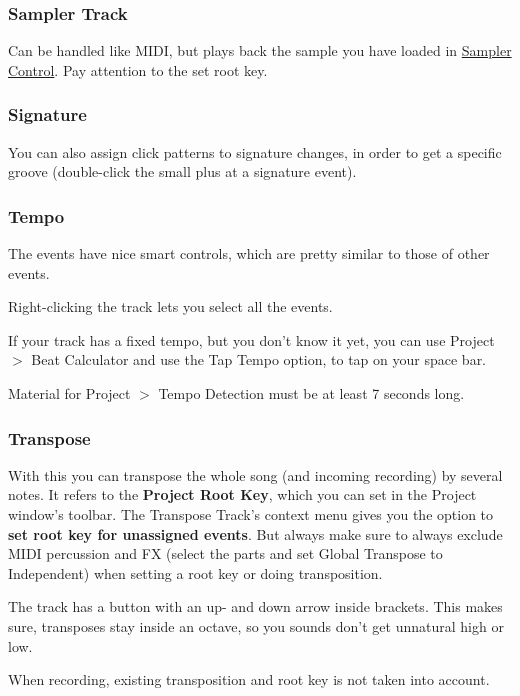 \documentclass[10pt]{article}
\begin{document}
\subsubsection{Sampler Track}

Can be handled like MIDI, but plays back the sample you have loaded in \hyperlink{SampContr}{Sampler Control}. Pay attention to the set root key.

\subsubsection{Signature}

You can also assign click patterns to signature changes, in order to get a specific groove (double-click the small plus at a signature event).

\subsubsection{Tempo}

The events have nice smart controls, which are pretty similar to those of other events.

Right-clicking the track lets you select all the events.

If your track has a fixed tempo, but you don't know it yet, you can use Project $>$ Beat Calculator and use the Tap Tempo option, to tap on your space bar.

Material for Project $>$ Tempo Detection must be at least 7 seconds long.

\subsubsection{Transpose}

With this you can transpose the whole song (and incoming recording) by several notes. It refers to the \textbf{Project Root Key}, which you can set in the Project window's toolbar. The Transpose Track's context menu gives you the option to \textbf{set root key for unassigned events}. But always make sure to always exclude MIDI percussion and FX (select the parts and set Global Transpose to Independent) when setting a root key or doing transposition.

The track has a button with an up- and down arrow inside brackets. This makes sure, transposes stay inside an octave, so you sounds don't get unnatural high or low.

When recording, existing transposition and root key is not taken into account.
\end{document}
